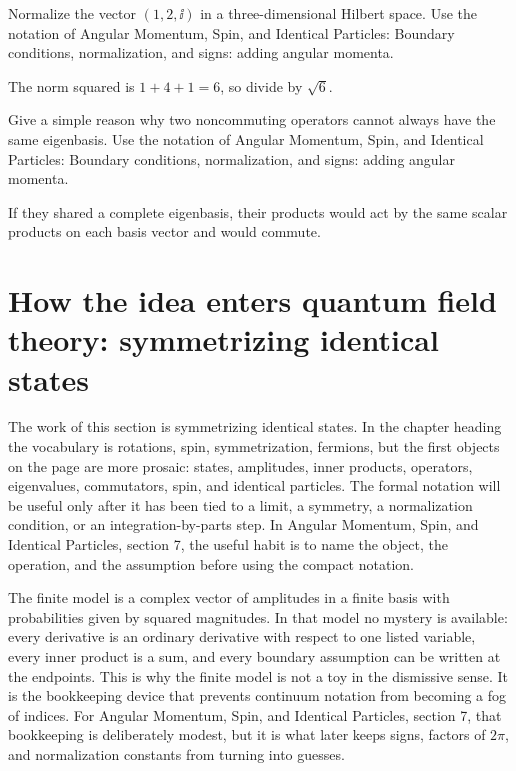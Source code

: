 \begin{exercise}
Normalize the vector \((1,2,\ii)\) in a three-dimensional Hilbert space.  Use the notation of Angular Momentum, Spin, and Identical Particles: Boundary conditions, normalization, and signs: adding angular momenta.
\begin{answer}
The norm squared is \(1+4+1=6\), so divide by \(\sqrt6\).
\end{answer}
\end{exercise}

\begin{exercise}
Give a simple reason why two noncommuting operators cannot always have the same eigenbasis.  Use the notation of Angular Momentum, Spin, and Identical Particles: Boundary conditions, normalization, and signs: adding angular momenta.
\begin{answer}
If they shared a complete eigenbasis, their products would act by the same scalar products on each basis vector and would commute.
\end{answer}
\end{exercise}



\section{How the idea enters quantum field theory: symmetrizing identical states}

The work of this section is symmetrizing identical states.  In the chapter heading the vocabulary is rotations, spin, symmetrization, fermions, but the first objects on the page are more prosaic: states, amplitudes, inner products, operators, eigenvalues, commutators, spin, and identical particles.  The formal notation will be useful only after it has been tied to a limit, a symmetry, a normalization condition, or an integration-by-parts step.  In Angular Momentum, Spin, and Identical Particles, section 7, the useful habit is to name the object, the operation, and the assumption before using the compact notation.

The finite model is a complex vector of amplitudes in a finite basis with probabilities given by squared magnitudes.  In that model no mystery is available: every derivative is an ordinary derivative with respect to one listed variable, every inner product is a sum, and every boundary assumption can be written at the endpoints.  This is why the finite model is not a toy in the dismissive sense.  It is the bookkeeping device that prevents continuum notation from becoming a fog of indices.  For Angular Momentum, Spin, and Identical Particles, section 7, that bookkeeping is deliberately modest, but it is what later keeps signs, factors of \(2\pi\), and normalization constants from turning into guesses.

